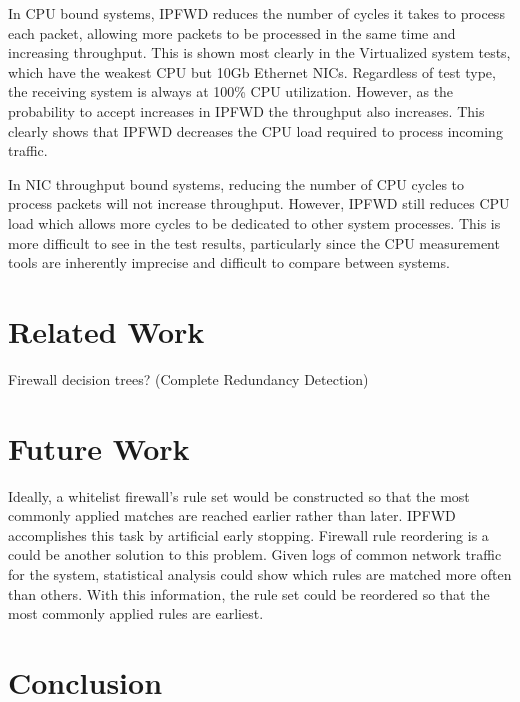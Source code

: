 \documentclass[journal]{IEEEtran}
\begin{document}
  In CPU bound systems, IPFWD reduces the number of cycles it takes to process
  each packet, allowing more packets to be processed in the same time and
  increasing throughput. This is shown most clearly in the Virtualized system
  tests, which have the weakest CPU but 10Gb Ethernet NICs. Regardless of test
  type, the receiving system is always at 100\% CPU utilization. However, as
  the probability to accept increases in IPFWD the throughput also increases.
  This clearly shows that IPFWD decreases the CPU load required to process
  incoming traffic.

  In NIC throughput bound systems, reducing the number of CPU cycles to process
  packets will not increase throughput. However, IPFWD still reduces CPU load
  which allows more cycles to be dedicated to other system processes. This is
  more difficult to see in the test results, particularly since the CPU
  measurement tools are inherently imprecise and difficult to compare between
  systems.


\section{Related Work}

Firewall decision trees? (Complete Redundancy Detection)



\section{Future Work}
Ideally, a whitelist firewall's rule set would be constructed so that the most
commonly applied matches are reached earlier rather than later. IPFWD
accomplishes this task by artificial early stopping. Firewall rule reordering
is a could be another solution to this problem. Given logs of common network
traffic for the system, statistical analysis could show which rules are matched
more often than others. With this information, the rule set could be reordered
so that the most commonly applied rules are earliest.


\section{Conclusion}


\end{document}
